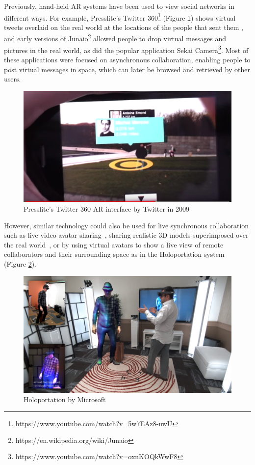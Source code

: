Previously, hand-held AR systems have been used to view social networks in different ways. For example, Presslite's Twitter 360\footnote{https://www.youtube.com/watch?v=5w7EAz8-uwU} (Figure \ref{fig:presslite}) shows virtual tweets overlaid on the real world at the locations of the people that sent them , and early versions of Junaio\footnote{https://en.wikipedia.org/wiki/Junaio} allowed people to drop virtual messages and pictures in the real world, as did the popular application Sekai Camera\footnote{https://www.youtube.com/watch?v=oxnKOQkWwF8}. Most of these applications were focused on asynchronous collaboration, enabling people to post virtual messages in space, which can later be browsed and retrieved by other users. 

\begin{figure}
    \centering
    \includegraphics[width=0.8\linewidth]{images/Presslite-twitter-360.PNG}
    \caption{Presslite's Twitter 360 AR interface by Twitter in 2009}
    \label{fig:presslite}
\end{figure}

However, similar technology could also be used for live synchronous collaboration such as live video avatar sharing~\cite{Billinghurst2002}, sharing realistic 3D models superimposed over the real world~\cite{Fanello2016}, or by using virtual avatars to show a live view of remote collaborators and their surrounding space as in the Holoportation system~\cite{Fanello2016} (Figure \ref{fig:holoportation}).

\begin{figure}
    \centering
    \includegraphics[width=0.8\linewidth]{images/holoportation.png}
    \caption{Holoportation by Microsoft \cite{Fanello2016}}
    \label{fig:holoportation}
\end{figure}

